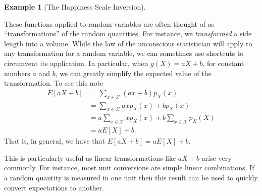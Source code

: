 \documentclass[
  letterpaper,
  DIV=11,
  numbers=noendperiod]{scrreprt}
\theoremstyle{definition}
\theoremstyle{definition}
\theoremstyle{definition}
\newtheorem{example}{Example}[chapter]
\theoremstyle{remark}
\begin{document}
\begin{example}[The Happiness Scale
Inversion]
\begin{tcolorbox}[enhanced jigsaw, colback=white, breakable, rightrule=.15mm, leftrule=.75mm, toprule=.15mm, left=2mm, arc=.35mm, opacityback=0, bottomrule=.15mm]
\end{tcolorbox}

\end{example}

These functions applied to random variables are often thought of as
``transformations'' of the random quantities. For instance, we
\emph{transformed} a side length into a volume. While the law of the
unconscious statistician will apply to any transformation for a random
variable, we can sometimes use shortcuts to circumvent its application.
In particular, when \(g(X) = aX + b\), for constant numbers \(a\) and
\(b\), we can greatly simplify the expected value of the transformation.
To see this note \begin{align*}
E[aX + b] &= \sum_{x\in\mathcal{X}}(ax + b)p_X(x) \\
&= \sum_{x\in\mathcal{X}}axp_X(x) + bp_X(x) \\
&= a\sum_{x\in\mathcal{X}}xp_X(x) + b\sum_{x\in\mathcal{X}}p_X(X) \\
&= aE[X] + b.
\end{align*} That is, in general, we have that
\(E[aX + b] = aE[X] + b\).

This is particularly useful as linear transformations like \(aX+b\)
arise very commonly. For instance, most unit conversions are simple
linear combinations. If a random quantity is measured in one unit then
this result can be used to quickly convert expectations to another.
\end{document}

